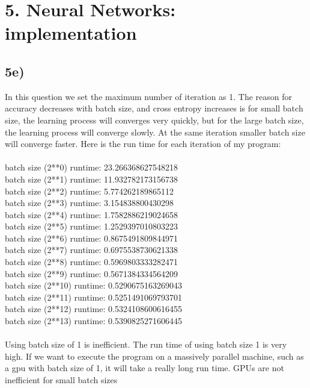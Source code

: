 \documentclass{article}  %
\begin{document}
\section{5. Neural Networks: implementation}
 \subsection{5e)} 
 In this question we set the maximum number of iteration as 1. The reason for accuracy decreases with batch size, and cross entropy increases is for small batch size, the learning process will converges very quickly, but for the large batch size, the learning process will converge slowly. At the same iteration smaller batch size will converge faster. Here is the run time for each iteration of my program:\\\\
 batch size (2**0) runtime: 23.266368627548218\\
batch size (2**1) runtime: 11.932782173156738\\
batch size (2**2) runtime: 5.774262189865112\\
batch size (2**3) runtime: 3.154838800430298\\
batch size (2**4) runtime: 1.7582886219024658\\
batch size (2**5) runtime: 1.2529397010803223\\
batch size (2**6) runtime: 0.8675491809844971\\
batch size (2**7) runtime: 0.6975538730621338\\
batch size (2**8) runtime: 0.5969803333282471\\
batch size (2**9) runtime: 0.5671384334564209\\
batch size (2**10) runtime: 0.5290675163269043\\
batch size (2**11) runtime: 0.5251491069793701\\
batch size (2**12) runtime: 0.5324108600616455\\
batch size (2**13) runtime: 0.5390825271606445\\\\
Using batch size of 1 is inefficient. The run time of using batch size 1 is very high. If we want to execute the program on a massively parallel machine, such as a gpu with batch size of 1, it will take a really long run time. GPUs are not inefficient for small batch sizes
\end{document}
